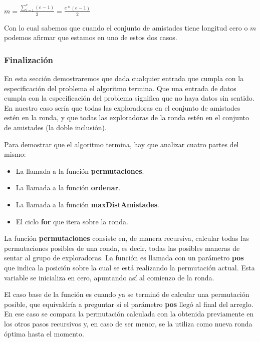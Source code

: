 \documentclass[11pt]{article}
\begin{document}
\begin{center}
$m = \frac{\sum\limits_{i=1}^e (e-1)}{2} = \frac{e*(e-1)}{2}$
\end{center}

\vspace{3mm}

Con lo cual sabemos que cuando el conjunto de amistades tiene longitud cero o $m$ podemos afirmar que estamos 
en uno de estos dos casos.





\subsubsection{Finalización}

En esta sección demostraremos que dada cualquier entrada que cumpla con la especificación del problema el 
algoritmo termina. Que una entrada de datos cumpla con la especificación del problema significa que no haya
datos sin sentido. En nuestro caso sería que todas las exploradoras en el conjunto de amistades estén en la  
ronda, y que todas las exploradoras de la ronda estén en el conjunto de amistades (la doble inclusión).

Para demostrar que el algoritmo termina, hay que analizar cuatro partes del mismo:
\begin{itemize}
  \item La llamada a la función \textbf{permutaciones}.
  \item La llamada a la función \textbf{ordenar}.
  \item La llamada a la función \textbf{maxDistAmistades}.
  \item El ciclo \textbf{for} que itera sobre la ronda.
\end{itemize}

La función \textbf{permutaciones} consiste en, de manera recursiva, calcular todas las permutaciones posibles 
de una ronda, es decir, todas las posibles maneras de sentar al grupo de exploradoras.
La función es llamada con un parámetro \textbf{pos} que indica la posición sobre la cual se está realizando 
la permutación actual. Esta variable se inicializa en cero, apuntando así al comienzo de la ronda.

El caso base de la función es cuando ya se terminó de calcular una permutación posible, que equivaldría a 
preguntar si el parámetro \textbf{pos} llegó al final del arreglo. En ese caso se compara la 
permutación calculada con la obtenida previamente en los otros pasos recursivos y, en caso de ser menor, se 
la utiliza como nueva ronda óptima hasta el momento.
\end{document}
